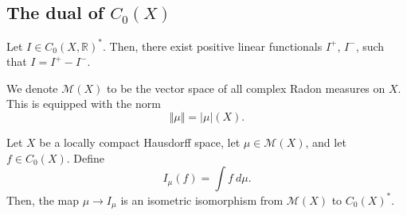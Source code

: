 \documentclass[11pt]{article}
\newcommand{\R}{\mathbb{R}}
\newcommand{\norm}[1]{\Vert #1 \Vert}
\theoremstyle{definition}
\theoremstyle{remark}
\begin{document}
    \subsection{The dual of $C_0(X)$}

    \begin{lemma}
        Let $I \in C_0(X, \R)^*$. Then, there exist positive linear functionals
        $I^+$, $I^-$, such that $I = I^+ - I^-$.
    \end{lemma}

    \begin{definition}
        We denote $\mathscr{M}(X)$ to be the vector space of all complex Radon
        measures on $X$. This is equipped with the norm \[
            \norm{\mu} = |\mu|(X).
        \]
    \end{definition}

    \begin{theorem}
        Let $X$ be a locally compact Hausdorff space, let $\mu \in \mathscr{M}(X)$,
        and let $f \in C_0(X)$. Define \[
            I_\mu(f) = \int f\:d\mu.
        \] Then, the map $\mu \to I_\mu$ is an isometric isomorphism from
        $\mathscr{M}(X)$ to $C_0(X)^*$.
    \end{theorem}
\end{document}
